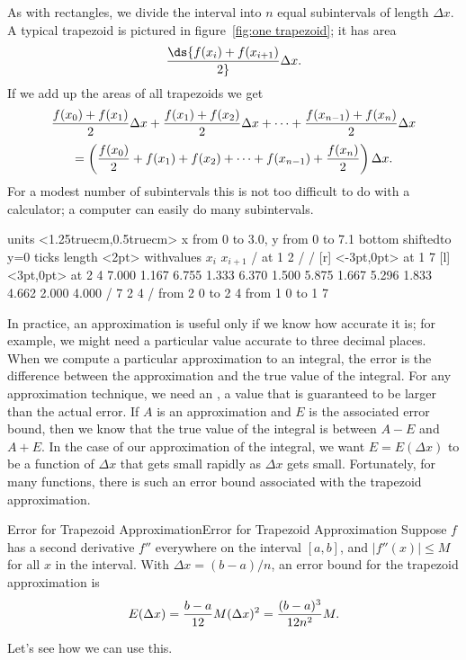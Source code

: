 As with rectangles, we divide the interval into $n$ equal subintervals
of length $\Delta x$.
A typical trapezoid is pictured in figure~\ref{fig:one trapezoid};
it has area $$\ds{f(x_i)+f(x_{i+1})\over2}\Delta x.$$ 
If we add up the
  areas of all trapezoids we get
$${f(x_0)+f(x_1)\over2}\Delta x+{f(x_1)+f(x_2)\over2}\Delta x+\cdots+
  {f(x_{n-1})+f(x_n)\over2}\Delta x$$
  $$=\left({f(x_0)\over2}+f(x_1)+f(x_2)+\cdots+f(x_{n-1})+{f(x_n)\over2}\right)
  \Delta x.$$
For a modest number of subintervals this is not too difficult to do
with a calculator; a computer can easily do many subintervals.

\figure[H]
\centerline{\vbox{\beginpicture
\normalgraphs
\setcoordinatesystem units <1.25truecm,0.5truecm>
\setplotarea x from 0 to 3.0, y from 0 to 7.1
\axis bottom shiftedto y=0 ticks length <2pt> 
  withvalues {$x_i$} {$x_{i+1}$} / at 1 2 / /
 [r] <-3pt,0pt> at 1 7
 [l] <3pt,0pt> at 2 4
\setquadratic
{} 7.000 1.167 6.755 1.333 6.370 1.500 5.875 1.667 5.296
1.833 4.662 2.000 4.000 /
\setlinear
\setdashes <2pt>
 7 2 4  /
\putrule from 2 0 to 2 4
\putrule from 1 0 to 1 7
\endpicture}}
\caption{\label{fig:one trapezoid}
A single trapezoid.}
\endfigure

In practice, an approximation is useful only if we know how accurate
it is; for example, we might need a particular value accurate to three
decimal places. When we compute a particular approximation to an
integral, the error is the difference between the approximation and
the true value of the integral. For any approximation technique, we
need an , a value that
is guaranteed to be larger than the actual error. If $A$ is an
approximation and $E$ is the associated error bound, then we know
that the true value of the integral is between $A-E$ and
$A+E$. In the case of our approximation of the integral, we want
$E=E(\Delta x)$ to be a function of $\Delta x$ that gets small rapidly
as $\Delta x$ gets small. Fortunately, for many functions, there is
such an error bound associated with the trapezoid approximation.

\begin{theorem}{Error for Trapezoid Approximation}{Error for Trapezoid Approximation}\label{Error for Trapezoid Approximation}
Suppose $f$ has a second derivative $f''$ everywhere on the
interval $[a,b]$, and $|f''(x)|\le M$ for all $x$ in the
interval. With $\Delta x= (b-a)/n$, an error bound for the
trapezoid approximation is
$$
  E(\Delta x) = {b-a\over12}M(\Delta x)^2={(b-a)^3\over 12n^2}M.
$$
\end{theorem}
Let's see how we can use this. 

